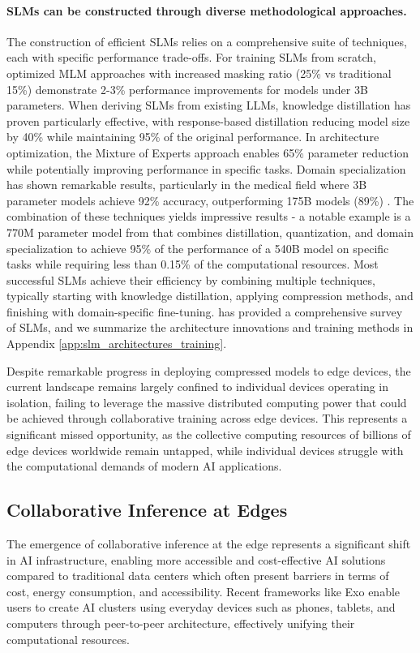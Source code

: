\paragraph{SLMs can be constructed through diverse methodological approaches.}
The construction of efficient SLMs relies on a comprehensive suite of techniques, each with specific performance trade-offs. 
For training SLMs from scratch, optimized MLM approaches \cite{devlin2019bert} with increased masking ratio (25\% vs traditional 15\%) demonstrate 2-3\% performance improvements for models under 3B parameters.
When deriving SLMs from existing LLMs, knowledge distillation has proven particularly effective, with response-based distillation \cite{sanh2019distilbert} reducing model size by 40\% while maintaining 95\% of the original performance.
In architecture optimization, the Mixture of Experts approach \cite{fedus2022switch} enables 65\% parameter reduction while potentially improving performance in specific tasks. Domain specialization has shown remarkable results, particularly in the medical field where 3B parameter models achieve 92\% accuracy, outperforming 175B models (89\%) \cite{fu2023specializing}.
The combination of these techniques yields impressive results - a notable example is a 770M parameter model from \cite{hsieh2023distilling} that combines distillation, quantization, and domain specialization to achieve 95\% of the performance of a 540B model on specific tasks while requiring less than 0.15\% of the computational resources. Most successful SLMs achieve their efficiency by combining multiple techniques, typically starting with knowledge distillation, applying compression methods, and finishing with domain-specific fine-tuning. 
\cite{wang2024comprehensive} has provided a comprehensive survey of SLMs, and we summarize the architecture innovations and training methods in Appendix \ref{app:slm_architectures_training}. 


Despite remarkable progress in deploying compressed models to edge devices, the current landscape remains largely confined to individual devices operating in isolation, failing to leverage the massive distributed computing power that could be achieved through collaborative training across edge devices. This represents a significant missed opportunity, as the collective computing resources of billions of edge devices worldwide remain untapped, while individual devices struggle with the computational demands of modern AI applications.

\subsection{Collaborative Inference at Edges}\label{subsec:collaborative_inference}
The emergence of collaborative inference at the edge represents a significant shift in AI infrastructure, enabling more accessible and cost-effective AI solutions compared to traditional data centers which often present barriers in terms of cost, energy consumption, and accessibility. Recent frameworks like Exo \cite{exo} enable users to create AI clusters using everyday devices such as phones, tablets, and computers through peer-to-peer architecture, effectively unifying their computational resources.

